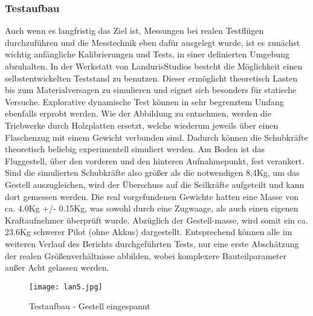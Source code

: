 \subsubsection{Testaufbau}
Auch wenn es langfristig das Ziel ist, Messungen bei realen Testflügen durchzuführen und die Messtechnik eben dafür ausgelegt wurde,
ist es zunächst wichtig anfängliche Kalibrierungen und Tests, in einer definierten Umgebung abzuhalten.
In der Werkstatt von LandurisStudios besteht die Möglichkeit einen selbstentwickelten Teststand zu benutzen.
Dieser ermöglicht theoretisch Lasten bis zum Materialversagen zu simulieren und eignet sich besonders für statische Versuche.
Explorative dynamische Test können in sehr begrenztem Umfang ebenfalls erprobt werden.   Wie der Abbildung zu entnehmen, werden die Triebwerke durch Holzplatten ersetzt,
welche wiederum jeweils über einen Flaschenzug mit einem Gewicht verbunden sind. Dadurch können die Schubkräfte theoretisch beliebig experimentell simuliert werden.
Am Boden ist das Fluggestell, über den vorderen und den hinteren Aufnahmepunkt, fest verankert. Sind die simulierten Schubkräfte also größer als die notwendigen 8,4Kg,
um das Gestell auszugleichen, wird der Überschuss auf die Seilkräfte aufgeteilt und kann dort gemessen werden.
Die real vorgefundenen Gewichte hatten eine Masse von ca. 4.0Kg +/- 0.15Kg, was sowohl durch eine Zugwaage, als auch einen eigenen Kraftaufnehmer überprüft wurde.
Abzüglich der Gestell-masse, wird somit ein ca. 23.6Kg schwerer Pilot (ohne Akkus) dargestellt. Entsprechend können alle im weiteren Verlauf des Berichts durchgeführten Tests,
nur eine erste Abschätzung der realen Größenverhältnisse abbilden, wobei komplexere Bauteilparameter außer Acht gelassen werden.
\begin{figure}[htbp]
    \begin{center}
        \texttt{[image: lan5.jpg]}
        \caption[Testaufbau - Gestell eingespannt (Abbildungsverzeichnis)]{Testaufbau - Gestell eingespannt}
        
        \label{fig:lan5}
    \end{center}
\end{figure}

